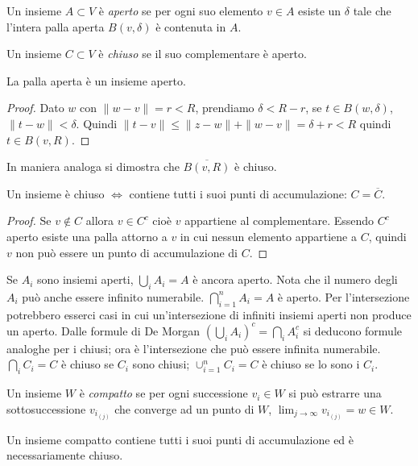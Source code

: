 \begin{definition}[aperto]
Un insieme $A \subset V$ è \emph{aperto} se per ogni suo elemento $v\in A$
esiste un $\delta$ tale che l'intera palla aperta $B(v, \delta)$ è contenuta
in $A$.
\end{definition}

\begin{definition}[chiuso]
Un insieme $C \subset V$ è \emph{chiuso} se il suo complementare è aperto.
\end{definition}

\begin{theorem}
La palla aperta è un insieme aperto.
\end{theorem}
\begin{proof}
Dato $w$ con $\|w-v\|=r<R$, prendiamo
$\delta < R-r$, se $t \in B(w, \delta)$, $\|t-w\| < \delta$. Quindi $\|t-v\|
\leq \|z-w\| + \|w-v\| = \delta +r < R$ quindi $t \in B(v,R)$. 
\end{proof}
In maniera analoga si dimostra che $\overline{B(v,R)}$ è chiuso.
\begin{theorem}
Un insieme è chiuso $\iff$ contiene tutti i suoi punti di accumulazione:
$C = \overline{C}$.
\end{theorem}
\begin{proof}
Se $v \notin C$ allora $v \in C^c$ cioè $v$ appartiene al
complementare. Essendo $C^c$ aperto esiste una palla attorno a $v$ in cui
nessun elemento appartiene a $C$, quindi $v$ non può essere un punto di
accumulazione di $C$.
\end{proof}
Se $A_i$ sono insiemi aperti, $\bigcup_i A_i = A$ è ancora aperto. Nota che
il numero degli $A_i$ può anche essere infinito numerabile. 
$\bigcap_{i = 1}^n A_i = A$ è aperto. Per l'intersezione potrebbero esserci
casi in cui un'intersezione di infiniti insiemi aperti non produce un aperto.
Dalle formule di De Morgan $(\bigcup_i A_i)^c = \bigcap_i A_i^c$ si deducono
formule analoghe per i chiusi; ora è l'intersezione che può essere infinita
numerabile. $\bigcap_i C_i = C$ è chiuso se $C_i$ sono chiusi; 
$\cup_{i=1}^n C_i = C$ è chiuso se lo sono i $C_i$.

\begin{definition}[compatto]
Un insieme $W$ è \emph{compatto} se per ogni successione $v_i\in W$ si può
estrarre una sottosuccessione $v_{i_{(j)}}$ che converge ad un punto di $W$,
$\lim_{j \to \infty} v_{i_{(j)}} = w \in W$.
\end{definition}

Un insieme compatto contiene tutti i suoi punti di accumulazione ed
è necessariamente chiuso.


